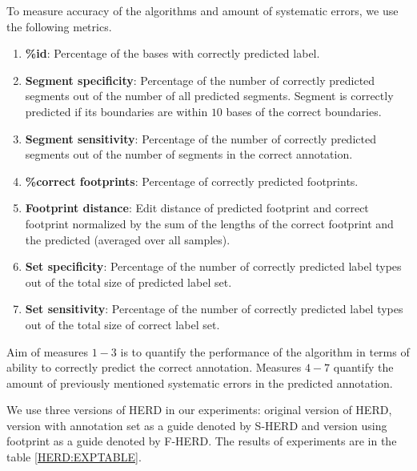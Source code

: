 To measure accuracy of the algorithms and amount of systematic errors, we use
the following metrics.
\begin{enumerate}[itemsep=-1mm]
\item {\bf \%id}: Percentage of the bases with correctly predicted label.

\item {\bf Segment specificity}: Percentage of the number of correctly predicted
segments out of the number of all predicted segments. Segment is correctly
predicted if its boundaries are within $10$ bases of the correct boundaries.

\item {\bf Segment sensitivity}: Percentage of the number of correctly predicted
segments out of the number of segments in the correct annotation.

\item {\bf \%correct footprints}: Percentage of correctly predicted footprints.

\item {\bf Footprint distance}: Edit distance of predicted footprint and
correct footprint normalized by the sum of the lengths of the correct footprint
and the predicted (averaged over all samples). 

\item {\bf Set specificity}: Percentage of the number of correctly predicted label
types out of the total size of predicted label set.

\item {\bf Set sensitivity}: Percentage of the number of correctly predicted label
types out of the total size of correct label set.

\end{enumerate} 
Aim of measures $1-3$ is to quantify the performance of the algorithm in terms
of ability to correctly predict the correct annotation. Measures $4-7$ quantify
the amount of previously mentioned systematic errors in the predicted annotation.

We use three versions of HERD in our experiments: original version of HERD,
version with annotation set as a guide denoted by S-HERD and version using
footprint as a guide denoted by F-HERD. The results of experiments are in the
table \ref{HERD:EXPTABLE}. 

